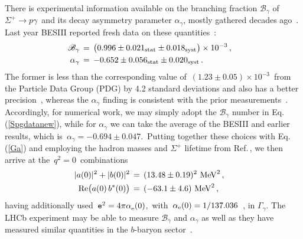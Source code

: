 \documentclass[amsmath,amssymb,aps,nofootinbib,prd,preprint,superscriptaddress,tightenlines,a4paper,bm]{revtex4-2}
\begin{document}
There is experimental information available on the branching fraction $\mathscr B_\gamma$ of \,$\Sigma^+\to p\gamma$\, and its decay asymmetry parameter $\alpha_\gamma$, mostly gathered decades ago~\cite{Workman:2022ynf}.
Last year BESIII reported fresh data on these quantities~\cite{BESIII:2023fhs}:
\begin{align} \label{Spgdatanew}
{\mathscr B}_\gamma & \,=\, \big(0.996\pm 0.021_{\rm stat}\pm0.018_{\rm syst}\big)\times10^{-3} \,, \\
 \alpha_
\gamma & \,=\, -0.652 \pm 0.056_{\rm stat}\pm0.020_{\rm syst} \,. & \nonumber
\end{align}
The former is less than the corresponding value of \,$(1.23\pm0.05)\times 10^{-3}$\, from the Particle Data Group (PDG) \cite{Workman:2022ynf} by 4.2 standard deviations and also has a better precision~\cite{BESIII:2023fhs}, whereas the $\alpha_\gamma$ finding is consistent with the prior measurements~\cite{Gershwin:1969fpe,Manz:1980td,Kobayashi:1987yv,E761:1992atm}.
Accordingly, for numerical work, we may simply adopt the $\mathscr B_\gamma$ number in Eq.\,\,(\ref{Spgdatanew}), while for $\alpha_\gamma$ we can take the average of the BESIII and earlier results, which is \,$\alpha_
\gamma=-0.694\pm0.047$.\,
Putting together these choices with Eq.\,(\ref{Ga}) and employing the hadron masses and $\Sigma^+$ lifetime from Ref.\,\cite{Workman:2022ynf}, we then arrive at the \,$q^2=0$\, combinations
\begin{align}  \label{Spgcons}
|a(0)|^{2}+|b(0)|^{2} & \,=\, (13.48\pm 0.19)^{2}{\rm ~MeV}^{2} \,, \nonumber \\
{\rm Re}\bigl(a(0)\,b^*(0)\bigr) & \,=\, (-63.1\pm4.6) {\rm ~MeV}^{2} \,, &
\end{align}
having additionally used \,${\tt e}^2 = 4\pi\alpha_{\rm e}^{}(0)$,\, with \,$\alpha_{\rm e}(0)=1/137.036$\, \cite{Workman:2022ynf}, in $\Gamma_\gamma$.
The LHCb experiment may be able to measure $\mathscr B_\gamma$ and $\alpha_\gamma$ as well as they have measured similar quantities in the $b$-baryon sector~\cite{LHCb:2021byf}.
\end{document}
